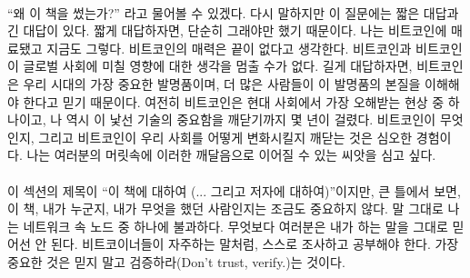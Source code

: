 \paragraph{}
\enquote{왜 이 책을 썼는가?} 라고 물어볼 수 있겠다.
다시 말하지만 이 질문에는 짧은 대답과 긴 대답이 있다.  
짧게 대답하자면, 단순히 그래야만 했기 때문이다. 나는 비트코인에 매료됐고 지금도 그렇다. 비트코인의 매력은 끝이 없다고 생각한다. 
비트코인과 비트코인이 글로벌 사회에 미칠 영향에 대한 생각을 멈출 수가 없다.
길게 대답하자면, 비트코인은 우리 시대의 가장 중요한 발명품이며, 더 많은 사람들이 이 발명품의 본질을 이해해야 한다고 믿기 때문이다. 
여전히 비트코인은 현대 사회에서 가장 오해받는 현상 중 하나이고, 나 역시 이 낯선 기술의 중요함을 깨닫기까지 몇 년이 걸렸다. 
비트코인이 무엇인지, 그리고 비트코인이 우리 사회를 어떻게 변화시킬지 깨닫는 것은 심오한 경험이다. 
나는 여러분의 머릿속에 이러한 깨달음으로 이어질 수 있는 씨앗을 심고 싶다.


\paragraph{}
이 섹션의 제목이 \enquote{이 책에 대하여 (... 그리고 저자에 대하여)}이지만, 큰 틀에서 보면, 이 책, 내가 누군지, 내가 무엇을 했던 사람인지는 조금도 중요하지 않다. 
말 그대로 나는 네트워크 속 노드 중 하나에 불과하다. 
무엇보다 여러분은 내가 하는 말을 그대로 믿어선 안 된다. 
비트코이너들이 자주하는 말처럼, 스스로 조사하고 공부해야 한다. 가장 중요한 것은 믿지 말고 검증하라(Don't trust, verify.)는 것이다.

